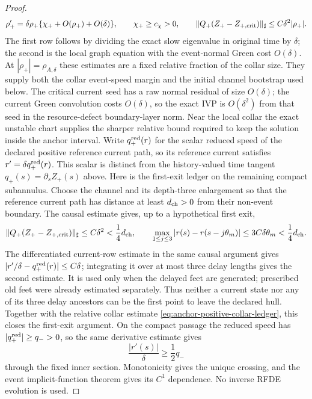 \begin{proof}
\begin{equation}
 \rho_+'=\delta\rho_+
   \{\chi_++O(\rho_+)+O(\delta)\},\qquad \chi_+\ge c_\chi>0,
 \qquad
 \|Q_+(Z_+-Z_{+,{\rm crit}})\|_{\sharp}
       \le C\delta^2|\rho_+| .                         \label{eq:anchor-positive-collar-ledger}
\end{equation}
The first row follows by dividing the exact slow eigenvalue in original
time by \(\delta\); the second is the local graph equation with the
event-normal Green cost \(O(\delta)\).  At
\(|\rho_+|=\rho_{A,\delta}\) these estimates are a fixed relative fraction
of the collar size.  They supply both the collar event-speed margin and the
initial channel bootstrap used below.
The critical current seed has a raw normal residual of size \(O(\delta)\);
the current Green convolution costs \(O(\delta)\), so the exact IVP is
\(O(\delta^2)\) from that seed in the resource-defect boundary-layer norm.
Near the local collar the exact unstable chart supplies the sharper
relative bound required to keep the solution inside the anchor interval.
Write \(q_+^{\rm red}(r)\) for the scalar reduced speed of the declared
positive reference current path, so its reference current satisfies
\(r'=\delta q_+^{\rm red}(r)\).  This scalar is distinct from the
history-valued time tangent \(q_+(s)=\partial_sZ_+(s)\) above.
Here is the first-exit ledger on the remaining compact subannulus.  Choose
the channel and its depth-three enlargement so that the reference current
path has distance at least \(d_{\rm ch}>0\) from their non-event boundary.
The causal estimate gives, up to a hypothetical first exit,
\begin{equation}
 \|Q_+(Z_+-Z_{+,\rm crit})\|_\sharp\le C\delta^2
       <\frac14d_{\rm ch},\qquad
 \max_{1\le j\le3}|r(s)-r(s-j\theta_m)|
       \le3C\delta\theta_m<\frac14d_{\rm ch}.        \label{eq:anchor-positive-first-exit-ledger}
\end{equation}
The differentiated current-row estimate in the same causal argument gives
\(|r'/\delta-q_+^{\rm red}(r)|\le C\delta\); integrating it over at most three
delay lengths gives the second estimate.  It is used only when the delayed
feet are generated; prescribed old feet were already estimated separately.
Thus neither a current state nor any of its three
delay ancestors can be the first point to leave the declared hull.  Together
with the relative collar estimate
\cref{eq:anchor-positive-collar-ledger}, this closes the first-exit
argument.  On the compact passage the reduced speed has
\(|q_+^{\rm red}|\ge q_->0\), so the same derivative estimate gives
\begin{equation}
 \frac{|r'(s)|}{\delta}\ge\frac12q_-               \label{eq:anchor-positive-event-speed-ledger}
\end{equation}
through the fixed inner section.  Monotonicity gives the unique crossing,
and the event implicit-function theorem gives its \(C^1\) dependence.  No
inverse RFDE evolution is used.


\end{proof}
